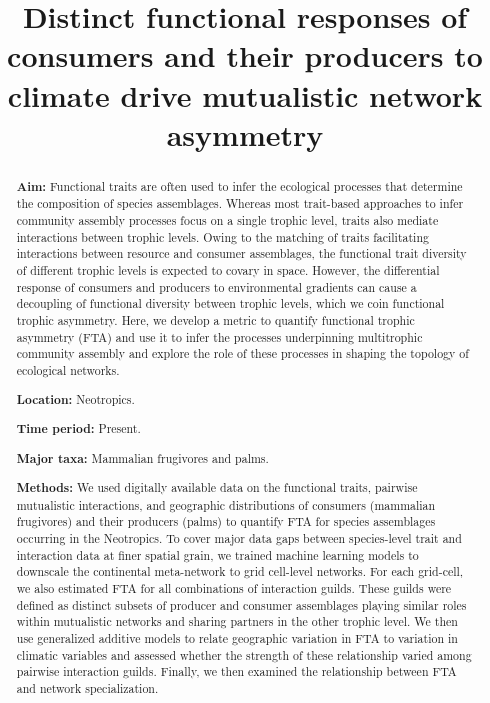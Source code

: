 \documentclass[
]{agujournal2019}
\begin{document}
\title{Distinct functional responses of consumers and their producers to
climate drive mutualistic network asymmetry}



\begin{abstract}
\textbf{Aim:} Functional traits are often used to infer the ecological
processes that determine the composition of species assemblages. Whereas
most trait-based approaches to infer community assembly processes focus
on a single trophic level, traits also mediate interactions between
trophic levels. Owing to the matching of traits facilitating
interactions between resource and consumer assemblages, the functional
trait diversity of different trophic levels is expected to covary in
space. However, the differential response of consumers and producers to
environmental gradients can cause a decoupling of functional diversity
between trophic levels, which we coin functional trophic asymmetry.
Here, we develop a metric to quantify functional trophic asymmetry (FTA)
and use it to infer the processes underpinning multitrophic community
assembly and explore the role of these processes in shaping the topology
of ecological networks.

\textbf{Location:} Neotropics.

\textbf{Time period:} Present.

\textbf{Major taxa:} Mammalian frugivores and palms.

\textbf{Methods:} We used digitally available data on the functional
traits, pairwise mutualistic interactions, and geographic distributions
of consumers (mammalian frugivores) and their producers (palms) to
quantify FTA for species assemblages occurring in the Neotropics. To
cover major data gaps between species-level trait and interaction data
at finer spatial grain, we trained machine learning models to downscale
the continental meta-network to grid cell-level networks. For each
grid-cell, we also estimated FTA for all combinations of interaction
guilds. These guilds were defined as distinct subsets of producer and
consumer assemblages playing similar roles within mutualistic networks
and sharing partners in the other trophic level. We then use generalized
additive models to relate geographic variation in FTA to variation in
climatic variables and assessed whether the strength of these
relationship varied among pairwise interaction guilds. Finally, we then
examined the relationship between FTA and network specialization.


\end{abstract}
\end{document}
